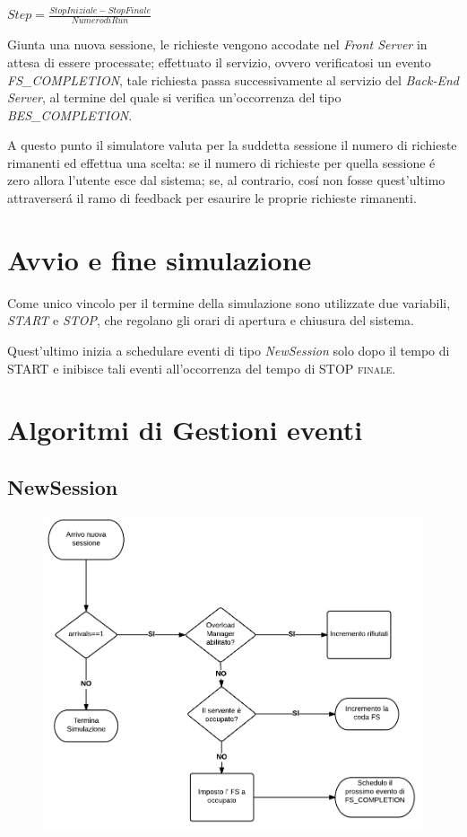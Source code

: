 \begin{center}
 $Step = \frac{Stop Iniziale - Stop Finale}{Numero di Run}$
\end{center}

Giunta una nuova sessione, le richieste vengono accodate nel \textit{Front Server} in attesa di essere processate; effettuato il servizio, ovvero verificatosi un evento \textit{FS\_COMPLETION}, tale richiesta passa successivamente al servizio del \textit{Back-End Server}, al termine del quale si verifica un'occorrenza del tipo \textit{BES\_COMPLETION}. 

A questo punto il simulatore valuta per la suddetta sessione il numero di richieste rimanenti ed effettua una scelta: se il numero di richieste per quella sessione \'e zero allora l'utente esce dal sistema; se, al contrario, cos\'i non fosse quest'ultimo attraverser\'a il ramo di feedback per esaurire le proprie richieste rimanenti.


\section{Avvio e fine simulazione}
Come unico vincolo per il termine della simulazione sono utilizzate due variabili, \textit{START} e \textit{STOP}, che regolano gli orari di apertura e chiusura del sistema.

\noindent Quest'ultimo inizia a schedulare eventi di tipo \textit{NewSession} solo dopo il tempo di \textsc{START} e inibisce tali eventi all'occorrenza del tempo di \textsc{STOP finale}.
\section{Algoritmi di Gestioni eventi}
\subsection{NewSession}
\begin{figure}[H]
  \centering
  \includegraphics[scale=0.35]{img/NewSession.png}
  \label{fig:NewSession}
\end{figure}
